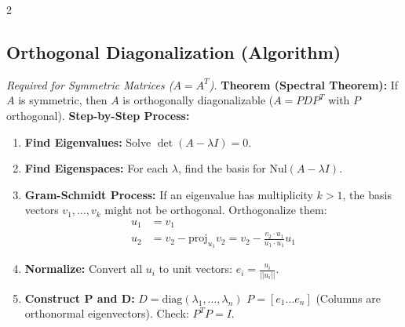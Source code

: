 \documentclass[10pt, letterpaper]{article}
\begin{document}
\begin{multicols*}{2}
\subsection{Orthogonal Diagonalization (Algorithm)}
\textit{Required for Symmetric Matrices ($A=A^T$).}
\textbf{Theorem (Spectral Theorem):} If $A$ is symmetric, then $A$ is orthogonally diagonalizable ($A = PDP^T$ with $P$ orthogonal).
\textbf{Step-by-Step Process:}
\begin{enumerate}
    \item \textbf{Find Eigenvalues:} Solve $\det(A - \lambda I) = 0$.
    \item \textbf{Find Eigenspaces:} For each $\lambda$, find the basis for $\text{Nul}(A - \lambda I)$.
    \item \textbf{Gram-Schmidt Process:} If an eigenvalue has multiplicity $k > 1$, the basis vectors $v_1, \dots, v_k$ might not be orthogonal. Orthogonalize them:
    \begin{align*}
        u_1 &= v_1 \\
        u_2 &= v_2 - \text{proj}_{u_1}v_2 = v_2 - \frac{v_2 \cdot u_1}{u_1 \cdot u_1}u_1
    \end{align*}
    \item \textbf{Normalize:} Convert all $u_i$ to unit vectors: $e_i = \frac{u_i}{||u_i||}$.
    \item \textbf{Construct P and D:}
    $D = \text{diag}(\lambda_1, \dots, \lambda_n)$
    $P = [e_1 \dots e_n]$ (Columns are orthonormal eigenvectors).
    Check: $P^T P = I$.
\end{enumerate}


\end{multicols*}
\end{document}
